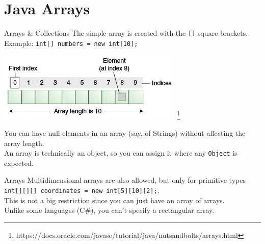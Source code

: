 \documentclass[aspectratio=169]{beamer}
\begin{document}
\section{Java Arrays}



\begin{frame}{Arrays \& Collections}
The simple array is created with the \texttt{[]} square brackets. \\
\vspace{0.5em}
Example: \texttt{int[] numbers = new int[10];} \\

\begin{center}
\includegraphics[height=0.35\textheight]{img/objects-tenElementArray.png}
\footnote{https://docs.oracle.com/javase/tutorial/java/nutsandbolts/arrays.html}
\end{center}

You can have null elements in an array (say, of Strings) without affecting the array length. \\
\vspace{0.5em}
An array is technically an object, so you can assign it where any \texttt{Object} is expected. \\
\vspace{2em}
\end{frame}



\begin{frame}{Arrays}
Multidimensional arrays are also allowed, but only for primitive types \\
\vspace{1em}
\texttt{int[][][]  coordinates = new int[5][10][2];}.  \\
\vspace{1em}
This is not a big restriction since you can just have an array of arrays. \\
\vspace{1em}
Unlike some languages (C\#), you can't specify a rectangular array. \\
\end{frame}
\end{document}
